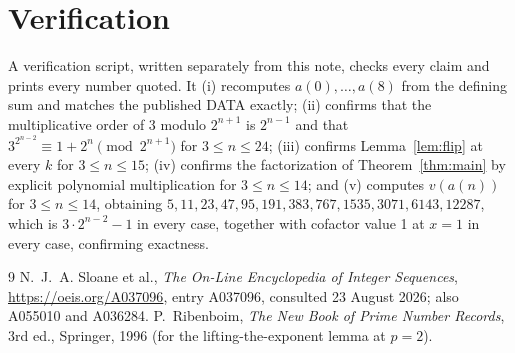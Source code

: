 \documentclass[11pt,a4paper]{article}
\theoremstyle{plain}
\theoremstyle{definition}
\begin{document}
\section{Verification}

A verification script, written separately from this note, checks every claim and prints
every number quoted. It (i) recomputes $a(0),\dots,a(8)$ from the defining sum and matches
the published DATA exactly; (ii) confirms that the multiplicative order of 3 modulo
$2^{n+1}$ is $2^{n-1}$ and that $3^{2^{n-2}}\equiv1+2^{n}\pmod{2^{n+1}}$ for
$3\le n\le24$; (iii) confirms Lemma~\ref{lem:flip} at every $k$ for $3\le n\le15$;
(iv) confirms the factorization of Theorem~\ref{thm:main} by explicit polynomial
multiplication for $3\le n\le14$; and (v) computes $v(a(n))$ for $3\le n\le14$, obtaining
$5,11,23,47,95,191,383,767,1535,3071,6143,12287$, which is $3\cdot2^{n-2}-1$ in every
case, together with cofactor value 1 at $x=1$ in every case, confirming exactness.

\begin{thebibliography}{9}
 N.~J.~A. Sloane et al., \emph{The On-Line Encyclopedia of Integer
Sequences}, \url{https://oeis.org/A037096}, entry A037096, consulted 23 August 2026; also
A055010 and A036284.
 P.~Ribenboim, \emph{The New Book of Prime Number Records}, 3rd ed.,
Springer, 1996 (for the lifting-the-exponent lemma at $p=2$).
\end{thebibliography}
\end{document}
